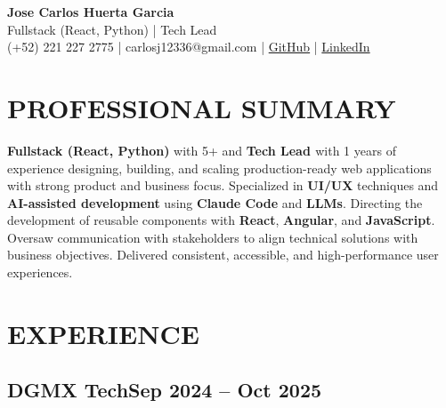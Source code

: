 \documentclass[a4paper,10pt]{article}
\newcommand{\kw}[1]{\textbf{\textcolor{keyword}{#1}}}
\begin{document}
\begin{center}
{\bfseries\LARGE Jose Carlos Huerta Garcia} \\
Fullstack (React, Python) | Tech Lead \\
(+52) 221 227 2775 | carlosj12336@gmail.com | \href{https://github.com/jcarloshg}{GitHub} | \href{https://www.linkedin.com/in/jose-carlos-huerta-garcia-773952212}{LinkedIn}
\end{center}

\section*{PROFESSIONAL SUMMARY}
\kw{Fullstack (React, Python)} with 5+ and \kw{Tech Lead } with 1 years of experience designing, building, and scaling production-ready web applications with strong product and business focus. Specialized in \kw{UI/UX} techniques and \kw{AI-assisted development} using \kw{Claude Code} and \kw{LLMs}. Directing the development of reusable components with \kw{React}, \kw{Angular}, and \kw{JavaScript}. Oversaw communication with stakeholders to align technical solutions with business objectives. Delivered consistent, accessible, and high-performance user experiences.

\section*{EXPERIENCE}

\subsection*{\small DGMX Tech\hfill\textbf{Sep 2024 -- Oct 2025}}
\end{document}
